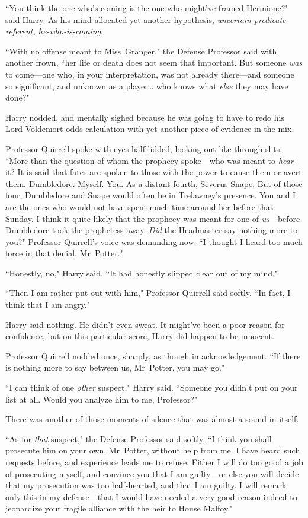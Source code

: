 ``You think the one who's coming is the one who might've framed Hermione?" said Harry. As his mind allocated yet another hypothesis, \emph{uncertain predicate referent, he-who-is-coming}.

``With no offense meant to Miss~Granger," the Defense Professor said with another frown, ``her life or death does not seem that important. But someone \emph{was} to come—one who, in your interpretation, was not already there—and someone so significant, and unknown as a player{\ldots} who knows what \emph{else} they may have done?"

Harry nodded, and mentally sighed because he was going to have to redo his Lord Voldemort odds calculation with yet another piece of evidence in the mix.

Professor Quirrell spoke with eyes half-lidded, looking out like through slits. ``More than the question of whom the prophecy spoke—who was meant to \emph{hear} it? It is said that fates are spoken to those with the power to cause them or avert them. Dumbledore. Myself. You. As a distant fourth, Severus Snape. But of those four, Dumbledore and Snape would often be in Trelawney's presence. You and I are the ones who would not have spent much time around her before that Sunday. I think it quite likely that the prophecy was meant for one of \emph{us}—before Dumbledore took the prophetess away. \emph{Did} the Headmaster say nothing more to you?" Professor Quirrell's voice was demanding now. ``I thought I heard too much force in that denial, Mr~Potter."

``Honestly, no," Harry said. ``It had honestly slipped clear out of my mind."

``Then I am rather put out with him," Professor Quirrell said softly. ``In fact, I think that I am angry."

Harry said nothing. He didn't even sweat. It might've been a poor reason for confidence, but on this particular score, Harry did happen to be innocent.

Professor Quirrell nodded once, sharply, as though in acknowledgement. ``If there is nothing more to say between us, Mr~Potter, you may go."

``I can think of one \emph{other} suspect," Harry said. ``Someone you didn't put on your list at all. Would you analyze him to me, Professor?"

There was another of those moments of silence that was almost a sound in itself.

``As for \emph{that} suspect," the Defense Professor said softly, ``I think you shall prosecute him on your own, Mr~Potter, without help from me. I have heard such requests before, and experience leads me to refuse. Either I will do too good a job of prosecuting myself, and convince you that I am guilty—or else you will decide that my prosecution was too half-hearted, and that I am guilty. I will remark only this in my defense—that I would have needed a very good reason indeed to jeopardize your fragile alliance with the heir to House Malfoy."

